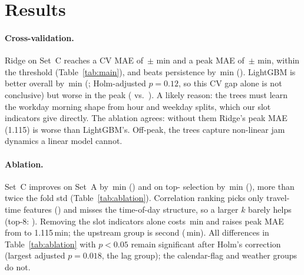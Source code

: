 \section{Results}\label{sec:results}
\begin{table}[t]\centering\small
{}
\caption{Main results in minutes (best per column in bold). CV: mean $\pm$ std over five
time-ordered folds. Decision threshold: peak MAE $\leq\res{cfg.threshold}$\,min.}\label{tab:main}
\vspace{2mm}
\caption{Feature ablation, Ridge with $\alpha$ tuned per set on the same folds (CV, min).
$\Delta$MAE: set minus C; $p$: paired $t$-test over folds.}\label{tab:ablation}
\end{table}

\paragraph{Cross-validation.} Ridge on Set~C reaches a CV MAE of
\,$\pm$\,\,min and a peak MAE of
\,$\pm$\,\,min, within the threshold
(Table~\ref{tab:main}), and beats persistence by \,min
(). LightGBM is better overall by \,min
(; Holm-adjusted $p=0.12$, so this CV gap alone is not conclusive) but worse in the peak ( vs.\ ). A
likely reason: the trees must learn the workday morning shape from hour and weekday splits, which
our slot indicators give directly. The ablation agrees: without them Ridge's peak MAE (1.115) is
worse than LightGBM's. Off-peak, the trees capture non-linear jam dynamics a linear model cannot.

\paragraph{Ablation.} Set~C improves on Set~A by \,min ()
and on top- selection by \,min (), more than
twice the fold std (Table~\ref{tab:ablation}). Correlation ranking picks only travel-time features
() and misses the time-of-day structure, so a larger $k$ barely helps (top-8:
). Removing the slot indicators alone costs
\,min and raises peak MAE from  to 1.115\,min;
the upstream group is second (\,min). All differences in
Table~\ref{tab:ablation} with $p<0.05$ remain significant after Holm's correction (largest
adjusted $p=0.018$, the lag group); the calendar-flag and weather groups do not.

